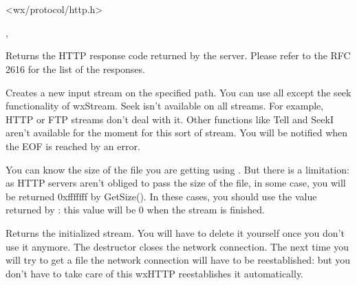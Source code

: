 \section{}\label{wxhttp}




<wx/protocol/http.h>


, 


\label{wxhttpgetresponse}


Returns the HTTP response code returned by the server. Please refer to the RFC
2616 for the list of the responses.


\label{wxhttpgetinputstream}


Creates a new input stream on the specified path. You can use all except the seek
functionality of wxStream. Seek isn't available on all streams. For example,
HTTP or FTP streams don't deal with it. Other functions like Tell and SeekI
aren't available for the moment for this sort of stream.
You will be notified when the EOF is reached by an error.


You can know the size of the file you are getting using .
But there is a limitation: as HTTP servers aren't obliged to pass the size of
the file, in some case, you will be returned 0xfffffff by GetSize(). In these
cases, you should use the value returned by :
this value will be 0 when the stream is finished.


Returns the initialized stream. You will have to delete it yourself once you
don't use it anymore. The destructor closes the network connection.
The next time you will try to get a file the network connection will have
to be reestablished: but you don't have to take care of this wxHTTP reestablishes it automatically.

